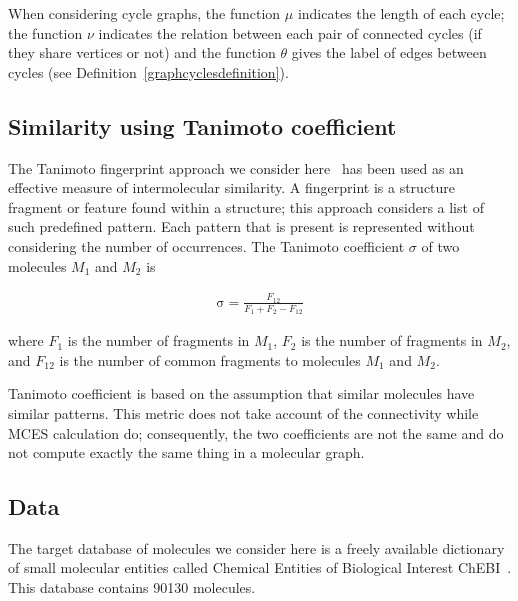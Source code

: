 \documentclass[10pt,letterpaper]{article}
\begin{document}
When considering cycle graphs,  the function $\mu$ indicates the length of each cycle; the function $\nu$  indicates the relation between each pair of  connected cycles (if they share vertices or not) and the function $\theta$ gives the label of edges between cycles (see Definition~\ref{graphcyclesdefinition}).


\subsection*{Similarity using Tanimoto coefficient}

The Tanimoto fingerprint approach we consider here~\cite{Tanimoto1960} has been used as an effective measure of intermolecular similarity. A fingerprint is a structure fragment or feature found within a structure; this approach considers a list of such predefined pattern. Each pattern that is present is represented without considering the number of occurrences. The Tanimoto coefficient $\sigma$ of two molecules $M_1$ and $M_2$ is

\begin{eqnarray}
\mathrm{\sigma}= \frac{F_{12}}{F_1 + F_2 - F_{12}}
\label{eq:tanimoto}
\end{eqnarray}

where $F_1$ is the number of fragments in $M_1$, $F_2$ is the number of fragments in $M_2$, and $F_{12}$ is the number of common fragments to molecules $M_1$ and $M_2$.

Tanimoto coefficient is based on the assumption that similar molecules have similar patterns. This metric does not take account of the connectivity while MCES calculation do; consequently, the two coefficients are not the same and do not compute exactly the same thing in a molecular graph.

\subsection*{Data}

The target database of molecules we consider here is a freely available dictionary of small molecular entities called Chemical Entities of Biological Interest ChEBI~\cite{chebi}. This database contains 90130 molecules.
\end{document}
